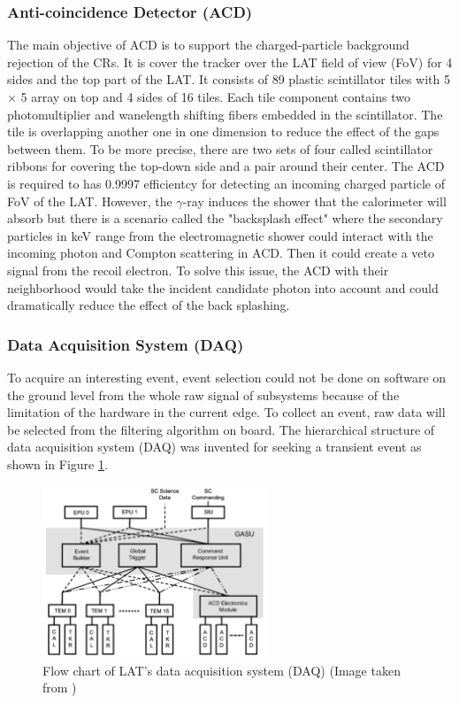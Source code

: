\subsubsection{Anti-coincidence Detector (ACD)}
The main objective of ACD is to support the charged-particle background rejection of the CRs. It is cover the tracker over the LAT field of 
view (FoV) for 4 sides and the top part of the LAT. It consists of 
89 plastic scintillator tiles with 5 $\times$ 5 array on top and 
4 sides of 16 tiles. Each tile component contains two photomultiplier 
and wanelength shifting fibers embedded in the scintillator. The tile 
is overlapping another one in one dimension to reduce the effect of 
the gaps between them. To be more precise, there are two sets 
of four called scintillator ribbons for covering the top-down side 
and a pair around their center. The ACD is required to has 0.9997 efficientcy 
for detecting an incoming charged particle of FoV of the LAT. However,
the $\gamma$-ray induces the shower that the calorimeter will absorb but 
there is a scenario called the "backsplash effect" where the secondary 
particles in keV range from the electromagnetic shower could interact 
with the incoming photon and Compton scattering in ACD. Then it could 
create a veto signal from the recoil electron. To solve this issue,
the ACD with their neighborhood would take the incident candidate photon 
into account and could dramatically reduce the effect of the back splashing.


\subsubsection{Data Acquisition System (DAQ)}


To acquire an interesting event, event selection could not be done on software on the ground level from the whole raw signal of subsystems because of the limitation of the hardware in the current edge. To collect an event, 
raw data will be selected from the filtering algorithm on board.
The hierarchical structure of data acquisition system (DAQ) was invented 
for seeking a transient event as shown in Figure \ref{fig:fermi_daq}.

\begin{figure}[h!]
    \centering
    \includegraphics[width=0.6\textwidth]{content/background/figures/fermi_daq.png}
    \caption{Flow chart of LAT's data acquisition system (DAQ) (Image taken from \cite{FermiLAT})}
    \label{fig:fermi_daq}
\end{figure}

